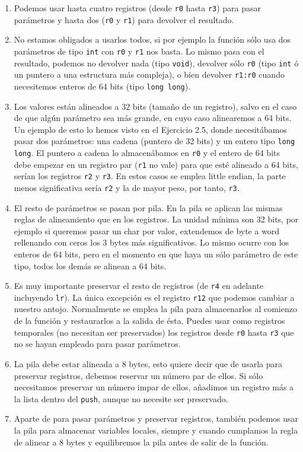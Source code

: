 \begin{enumerate}
  \item Podemos usar hasta cuatro registros (desde {\tt r0} hasta {\tt r3}) para pasar
        parámetros y hasta dos ({\tt r0} y {\tt r1}) para devolver el resultado.\newline
  \item No estamos obligados a usarlos todos, si por ejemplo la función sólo usa dos parámetros
        de tipo {\tt int} con {\tt r0} y {\tt r1} nos basta. Lo mismo pasa con el resultado,
        podemos no devolver nada (tipo {\tt void}), devolver sólo {\tt r0} (tipo {\tt int} ó un puntero
        a una estructura más compleja), o bien devolver {\tt r1:r0} cuando necesitemos enteros
        de 64 bits (tipo {\tt long long}).
  \item Los valores están alineados a 32 bits (tamaño de un registro), salvo en el caso de que
        algún parámetro sea más grande, en cuyo caso alinearemos a 64 bits. Un ejemplo de esto
        lo hemos visto en el Ejercicio 2.5, donde necesitábamos pasar dos parámetros: una cadena
        (puntero de 32 bits) y un entero tipo {\tt long long}. El puntero a cadena lo almacenábamos
        en {\tt r0} y el entero de 64 bits debe empezar en un registro par ({\tt r1} no vale)
        para que esté alineado a 64 bits, serían los registros {\tt r2} y {\tt r3}. En estos casos
        se emplea little endian, la parte menos significativa sería {\tt r2} y la de mayor peso, por
        tanto, {\tt r3}.
  \item El resto de parámetros se pasan por pila. En la pila se aplican las mismas reglas de
        alineamiento que en los registros. La unidad mínima son 32 bits, por ejemplo si queremos
        pasar un char por valor, extendemos de byte a word rellenando con ceros los 3 bytes
        más significativos. Lo mismo ocurre con los enteros de 64 bits, pero en el momento en que
        haya un sólo parámetro de este tipo, todos los demás se alinean a 64 bits.
  \item Es muy importante preservar el resto de registros (de {\tt r4} en
        adelante incluyendo {\tt lr}). La única excepción es el registro {\tt r12} que podemos
        cambiar a nuestro antojo. Normalmente se emplea la pila para almacenarlos al comienzo de
        la función y restaurarlos a la salida de ésta. Puedes usar como registros temporales
        (no necesitan ser preservados) los registros desde {\tt r0} hasta {\tt r3} que no se hayan
        empleado para pasar parámetros.
  \item La pila debe estar alineada a 8 bytes, esto quiere decir que de usarla para preservar
        registros, debemos reservar un número par de ellos. Si sólo necesitamos preservar un
        número impar de ellos, añadimos un registro más a la lista dentro del {\tt push},
        aunque no necesite ser preservado.
  \item Aparte de para pasar parámetros y preservar registros, también podemos usar la pila
        para almacenar variables locales, siempre y cuando cumplamos la regla de alinear a
        8 bytes y equilibremos la pila antes de salir de la función.
\end{enumerate}

